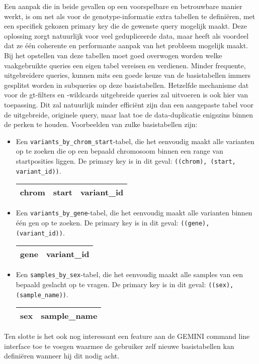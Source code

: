 Een aanpak die in beide gevallen op een voorspelbare en betrouwbare manier werkt, is om net als voor de genotype-informatie extra tabellen te defini\"eren, met een specifiek gekozen primary key die de gewenste query mogelijk maakt. Deze oplossing zorgt natuurlijk voor veel gedupliceerde data, maar heeft als voordeel dat ze \'e\'en coherente en performante aanpak van het probleem mogelijk maakt. Bij het opstellen van deze tabellen moet goed overwogen worden welke vaakgebruikte queries een eigen tabel vereisen en verdienen. Minder frequente, uitgebreidere queries, kunnen mits een goede keuze van de basistabellen immers gesplitst worden in subqueries op deze basistabellen. Hetzelfde mechanisme dat voor de gt-filters en -wildcards uitgebreide queries zal uitvoeren is ook hier van toepassing. Dit zal natuurlijk minder effici\"ent zijn dan een aangepaste tabel voor de uitgebreide, originele query, maar laat toe de data-duplicatie enigszins binnen de perken te houden. Voorbeelden van zulke basistabellen zijn:

\begin{itemize}
\item Een \texttt{variants\_by\_chrom\_start}-tabel, die het eenvoudig maakt alle varianten op te zoeken die op een bepaald chromosoom binnen een range van startposities liggen. De primary key is in dit geval: \texttt{((chrom), (start, variant\_id))}. 

\begin{table}[!htbp]
\begin{tabular}{@{}|l|l|l|@{}}
\toprule
 chrom & start & variant\_id \\ \bottomrule
\end{tabular}
\end{table}

\item Een \texttt{variants\_by\_gene}-tabel, die het eenvoudig maakt alle varianten binnen \'e\'en gen op te zoeken. De primary key is in dit geval: \texttt{((gene), (variant\_id))}.

\begin{table}[!htbp]
\begin{tabular}{@{}|l|l|@{}}
\toprule
 gene & variant\_id \\ \bottomrule
\end{tabular}
\end{table}

\item Een \texttt{samples\_by\_sex}-tabel, die het eenvoudig maakt alle samples van een bepaald geslacht op te vragen. De primary key is in dit geval: \texttt{((sex), (sample\_name))}.

\begin{table}[!htbp]
\begin{tabular}{@{}|l|l|@{}}
\toprule
 sex & sample\_name \\ \bottomrule
\end{tabular}
\end{table}
\end{itemize}

Ten slotte is het ook nog interessant een feature aan de GEMINI command line interface toe te voegen waarmee de gebruiker zelf nieuwe basistabellen kan defini\"eren wanneer hij dit nodig acht.
 